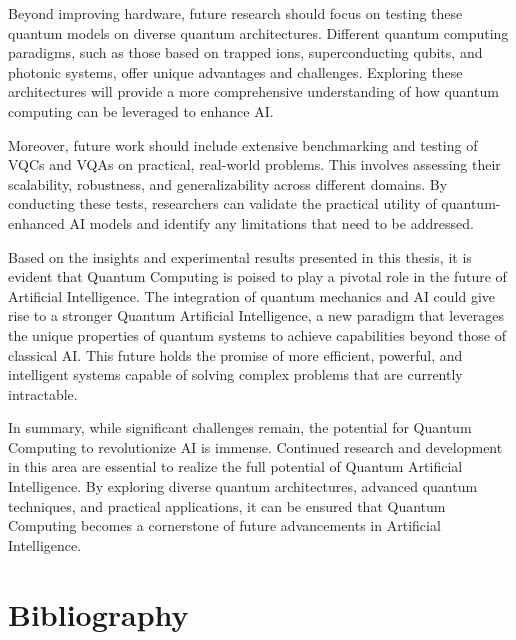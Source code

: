 \documentclass[12pt,a4paper]{report}
\begin{document}
Beyond improving hardware, future research should focus on testing these quantum models on diverse quantum architectures. Different quantum computing paradigms, such as those based on trapped ions, superconducting qubits, and photonic systems, offer unique advantages and challenges. Exploring these architectures will provide a more comprehensive understanding of how quantum computing can be leveraged to enhance AI.

Moreover, future work should include extensive benchmarking and testing of VQCs and VQAs on practical, real-world problems. This involves assessing their scalability, robustness, and generalizability across different domains. By conducting these tests, researchers can validate the practical utility of quantum-enhanced AI models and identify any limitations that need to be addressed.

Based on the insights and experimental results presented in this thesis, it is evident that Quantum Computing is poised to play a pivotal role in the future of Artificial Intelligence. The integration of quantum mechanics and AI could give rise to a stronger Quantum Artificial Intelligence, a new paradigm that leverages the unique properties of quantum systems to achieve capabilities beyond those of classical AI. This future holds the promise of more efficient, powerful, and intelligent systems capable of solving complex problems that are currently intractable.

In summary, while significant challenges remain, the potential for Quantum Computing to revolutionize AI is immense. Continued research and development in this area are essential to realize the full potential of Quantum Artificial Intelligence. By exploring diverse quantum architectures, advanced quantum techniques, and practical applications, it can be ensured that Quantum Computing becomes a cornerstone of future advancements in Artificial Intelligence.
\chapter{Bibliography}



\begingroup
\def\chapter*#1{}

\endgroup
\end{document}
